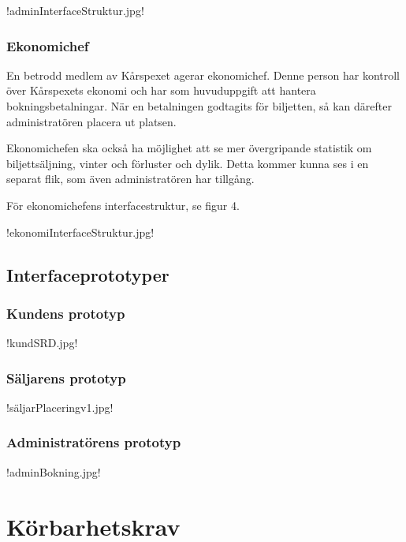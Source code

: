 \documentclass[a4paper, twoside, 11pt, titlepage]{article}
\begin{document}
		!adminInterfaceStruktur.jpg!

		\subsubsection{Ekonomichef}


		En betrodd medlem av Kårspexet agerar ekonomichef. Denne person har kontroll över Kårspexets ekonomi och har som huvuduppgift att hantera bokningsbetalningar. När en betalningen godtagits för biljetten, så kan därefter administratören placera ut platsen.

		Ekonomichefen ska också ha möjlighet att se mer övergripande statistik om biljettsäljning, vinter och förluster och dylik. Detta kommer kunna ses i en separat flik, som även administratören har tillgång.

		För ekonomichefens interfacestruktur, se figur 4.

		!ekonomiInterfaceStruktur.jpg!

	\subsection{Interfaceprototyper}



		\subsubsection{Kundens prototyp}


		!kundSRD.jpg!

		\subsubsection{Säljarens prototyp}


		!säljarPlaceringv1.jpg!

		\subsubsection{Administratörens prototyp}


		!adminBokning.jpg!

\clearpage
\section{Körbarhetskrav}
\end{document}
